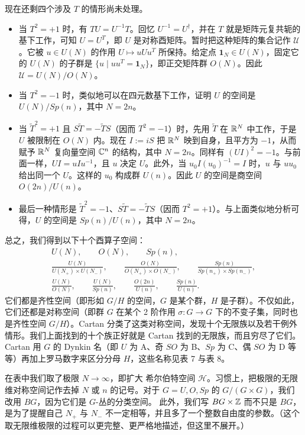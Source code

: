 现在还剩四个涉及 $T$ 的情形尚未处理。
\begin{itemize}
  \item 当 $T^2=+1$ 时，有 $TU=U^{-1}T$。回忆 $U^{-1}=U^\dagger$，并在 $T$ 就是矩阵元复共轭的基下工作，可知 $U=U^T$，即 $U$ 是对称酉矩阵。暂时把这种矩阵的集合记作 $\mathcal{U}$。它被 $u\in U(N)$ 的作用 $U\mapsto uUu^T$ 所保持。给定点 $\mathbf{1}_N\in U(N)$，固定它的 $U(N)$ 的子群是 $\{u\mid uu^T=\mathbf{1}_N\}$，即正交矩阵群 $O(N)$。因此 $\mathcal{U}=U(N)/O(N)$。
  \item 当 $T^2=-1$ 时，类似地可以在四元数基下工作，证明 $U$ 的空间是 $U(N)/Sp(n)$，其中 $N=2n$。
  \item 当 $\tilde T^2=+1$ 且 $S\tilde T=-\tilde TS$（因而 $T^2=-1$）时，先用 $\tilde T$ 在 $\mathbb{R}^N$ 中工作，于是 $U$ 被限制在 $O(N)$ 内。现在 $I:=iS$ 把 $\mathbb{R}^N$ 映到自身，且平方为 $-1$，从而赋予 $\mathbb{R}^N$ 复向量空间 $\mathbb{C}^n$ 的结构，其中 $N=2n$。同样有 $(UI)^2=-1$。与前面一样，$UI=uIu^{-1}$，且 $u$ 决定 $U$。此外，当 $u_0I(u_0)^{-1}=I$ 时，$u$ 与 $uu_0$ 给出同一个 $U$。这样的 $u_0$ 构成群 $U(n)$。因此 $U$ 的空间是商空间 $O(2n)/U(n)$。
  \item 最后一种情形是 $\tilde T^2=-1$、$S\tilde T=-\tilde TS$（因而 $T^2=+1$）。与上面类似地分析可得，$U$ 的空间是 $Sp(n)/U(n)$，其中 $N=2n$。
\end{itemize}
总之，我们得到以下十个酉算子空间：
\begin{equation}
\begin{gathered}
U(N),\qquad O(N),\qquad Sp(n),\\[2pt]
\frac{U(N)}{U(N_+)\times U(N_-)},\qquad
\frac{O(N)}{O(N_+)\times O(N_-)},\qquad
\frac{Sp(n)}{Sp(n_+)\times Sp(n_-)},\\[2pt]
\frac{U(N)}{O(N)},\qquad
\frac{U(N)}{Sp(n)},\qquad
\frac{O(2n)}{U(n)},\qquad
\frac{Sp(n)}{U(n)}.
\end{gathered} \tag{11.35}
\end{equation}
它们都是齐性空间（即形如 $G/H$ 的空间，$G$ 是某个群，$H$ 是子群）。不仅如此，它们还都是对称空间（即群 $G$ 在某个 2 阶作用 $\sigma:G\to G$ 下的不变子集，同时也是齐性空间 $G/H$）。Cartan 分类了这类对称空间，发现十个无限族以及若干例外情形。我们上面找到的十个族正好就是 Cartan 找到的无限族，而且穷尽了它们。Cartan 用 $G$ 的 Dynkin 名（即 $U$ 为 A、奇 $SO$ 为 B、$Sp$ 为 C、偶 $SO$ 为 D 等等）再加上罗马数字来区分分母 $H$，这些名称见表 7 与表 8。

在表中我们取了极限 $N\to\infty$，即扩大 希尔伯特空间 $\mathcal{H}$。习惯上，把极限的无限维对称空间记作去掉 $N$ 或 $n$ 的记号。对于 $G=U,O,Sp$ 的 $G/(G\times G)$，我们改用 $BG$，因为它们是 $G$-丛的分类空间。
此外，我们写 $BG\times\mathbb{Z}$ 而不只是 $BG$，是为了提醒自己 $N_+$ 与 $N_-$ 不一定相等，并且多了一个整数自由度的参数。（这个取无限维极限的过程可以更完整、更严格地描述，但这里不展开。）

